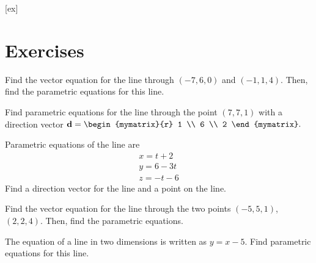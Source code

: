 [ex]
\section*{Exercises}

\begin{enumialphparenastyle}

\begin{ex} 
Find the vector equation for the line through $\left(
-7,6,0\right)$ and $\left(-1, 1 ,4 \right) .$  Then, find the parametric equations for this line. 
\end{ex}

\begin{ex} Find parametric equations for the line through the point $\left( 7, 7, 1 \right) $ with a direction vector $\vect{d} = \begin{mymatrix}{r}
1 \\
6 \\
2
\end{mymatrix} .$ 
\end{ex} 

\begin{ex} Parametric equations of the line are 
\begin{equation*}
\begin{array}{c}
x = t+2 \\
y = 6-3t \\
z = -t-6
\end{array}
\end{equation*}
Find a direction vector for the line and a point on the line.
\end{ex} 


\begin{ex} Find the vector equation for the line through the two points $\left(
-5, 5, 1 \right) $, $\left(2, 2 , 4 \right) .$  Then, find the parametric equations. 
\end{ex} 

\begin{ex} The equation of a line in two dimensions is written as $y=x-5.$ Find
parametric equations for this line. 
\end{ex} 


\end{enumialphparenastyle}
